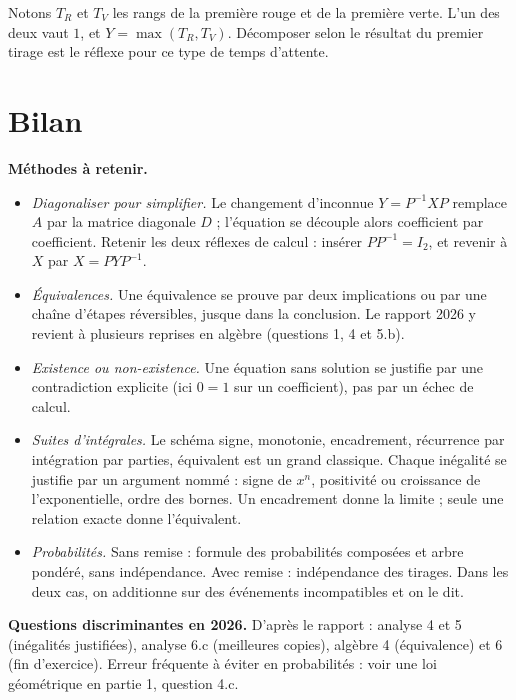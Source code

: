 \documentclass[11pt,a4paper]{article}
\providecommand{\tightlist}{\setlength{\itemsep}{0pt}\setlength{\parskip}{0pt}}
\begin{document}
\begin{methode}

Notons \(T_R\) et \(T_V\) les rangs de la première rouge et de la première verte. L'un des deux vaut \(1\), et \(Y=\max(T_R,T_V)\). Décomposer selon le résultat du premier tirage est le réflexe pour ce type de temps d'attente.

\end{methode}

\hypertarget{bilan}{%
\section{Bilan}\label{bilan}}

\textbf{Méthodes à retenir.}

\begin{itemize}
\tightlist
\item
  \emph{Diagonaliser pour simplifier.} Le changement d'inconnue \(Y=P^{-1}XP\) remplace \(A\) par la matrice diagonale \(D\) ; l'équation se découple alors coefficient par coefficient. Retenir les deux réflexes de calcul : insérer \(PP^{-1}=I_2\), et revenir à \(X\) par \(X=PYP^{-1}\).
\item
  \emph{Équivalences.} Une équivalence se prouve par deux implications ou par une chaîne d'étapes réversibles, jusque dans la conclusion. Le rapport 2026 y revient à plusieurs reprises en algèbre (questions 1, 4 et 5.b).
\item
  \emph{Existence ou non-existence.} Une équation sans solution se justifie par une contradiction explicite (ici \(0=1\) sur un coefficient), pas par un échec de calcul.
\item
  \emph{Suites d'intégrales.} Le schéma signe, monotonie, encadrement, récurrence par intégration par parties, équivalent est un grand classique. Chaque inégalité se justifie par un argument nommé : signe de \(x^n\), positivité ou croissance de l'exponentielle, ordre des bornes. Un encadrement donne la limite ; seule une relation exacte donne l'équivalent.
\item
  \emph{Probabilités.} Sans remise : formule des probabilités composées et arbre pondéré, sans indépendance. Avec remise : indépendance des tirages. Dans les deux cas, on additionne sur des événements incompatibles et on le dit.
\end{itemize}

\textbf{Questions discriminantes en 2026.} D'après le rapport : analyse 4 et 5 (inégalités justifiées), analyse 6.c (meilleures copies), algèbre 4 (équivalence) et 6 (fin d'exercice). Erreur fréquente à éviter en probabilités : voir une loi géométrique en partie 1, question 4.c.
\end{document}
